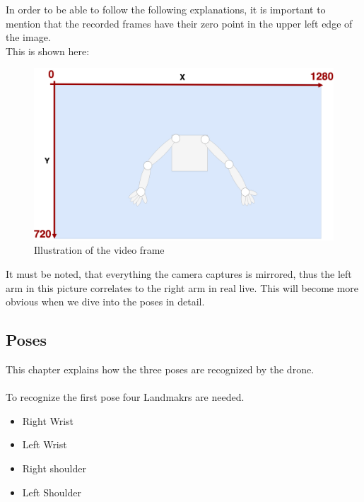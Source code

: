\documentclass[a4paper,11pt,singlespacing]{article}
\begin{document}
In order to be able to follow the following explanations, it is important to mention that the recorded frames have their 
zero point in the upper left edge of the image.\\
This is shown here:

\begin{figure}[H]
	\centering
	\includegraphics[width=\textwidth]{images/video_frame.png}
	\caption{Illustration of the video frame}
	\label{video_frame}
\end{figure}

It must be noted, that everything the camera captures is mirrored, thus the left arm 
in this picture correlates to the right arm in real live.
This will become more obvious when we dive into the poses in detail.
\subsection{Poses}

This chapter explains how the three poses are recognized by the drone.\\\\

To recognize the first pose four Landmakrs are needed.
\begin{itemize}
	\item Right Wrist
	\item Left Wrist
	\item Right shoulder
	\item Left Shoulder
\end{itemize}
\end{document}
